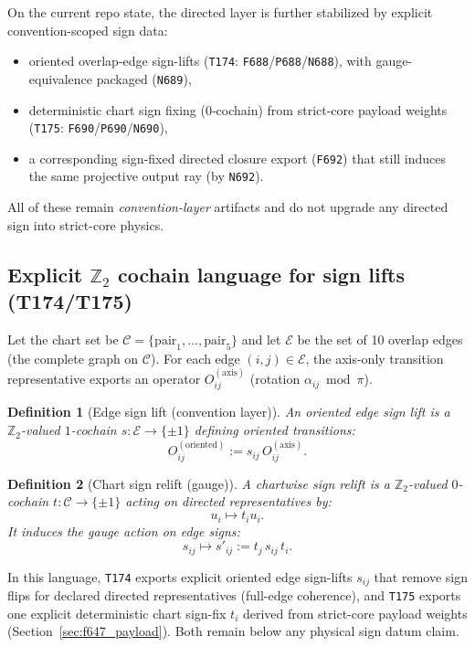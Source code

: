\documentclass[11pt,a4paper]{article}
\newtheorem{definition}{Definition}[section]
\begin{document}
On the current repo state, the directed layer is further stabilized by explicit convention-scoped sign data:
\begin{itemize}
  \item oriented overlap-edge sign-lifts (\texttt{T174}: \texttt{F688}/\texttt{P688}/\texttt{N688}), with gauge-equivalence packaged (\texttt{N689}),
  \item deterministic chart sign fixing (0‑cochain) from strict-core payload weights (\texttt{T175}: \texttt{F690}/\texttt{P690}/\texttt{N690}),
  \item a corresponding sign-fixed directed closure export (\texttt{F692}) that still induces the same projective output ray (by \texttt{N692}).
\end{itemize}
All of these remain \emph{convention-layer} artifacts and do not upgrade any directed sign into strict-core physics.

\subsection*{Explicit \texorpdfstring{$\mathbb{Z}_2$}{Z2} cochain language for sign lifts (T174/T175)}
Let the chart set be $\mathcal{C}=\{\mathrm{pair}_1,\dots,\mathrm{pair}_5\}$ and let $\mathcal{E}$ be the set of 10 overlap edges (the complete graph on $\mathcal{C}$).
For each edge $(i,j)\in\mathcal{E}$, the axis-only transition representative exports an operator $O_{ij}^{(\mathrm{axis})}$ (rotation $\alpha_{ij}\bmod \pi$).

\begin{definition}[Edge sign lift (convention layer)]
An oriented edge sign lift is a $\mathbb{Z}_2$-valued $1$-cochain $s:\mathcal{E}\to\{\pm 1\}$ defining oriented transitions:
\[
O_{ij}^{(\mathrm{oriented})}:=s_{ij}\,O_{ij}^{(\mathrm{axis})}.
\]
\end{definition}

\begin{definition}[Chart sign relift (gauge)]
A chartwise sign relift is a $\mathbb{Z}_2$-valued $0$-cochain $t:\mathcal{C}\to\{\pm 1\}$ acting on directed representatives by:
\[
u_i \mapsto t_i u_i.
\]
It induces the gauge action on edge signs:
\[
s_{ij}\mapsto s'_{ij}:=t_j\,s_{ij}\,t_i.
\]
\end{definition}

In this language, \texttt{T174} exports explicit oriented edge sign-lifts $s_{ij}$ that remove sign flips for declared directed representatives (full-edge coherence),
and \texttt{T175} exports one explicit deterministic chart sign-fix $t_i$ derived from strict-core payload weights (Section~\ref{sec:f647_payload}).
Both remain below any physical sign datum claim.
\end{document}
